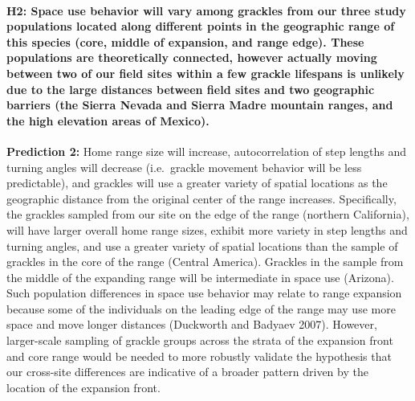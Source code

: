 \documentclass[
]{article}
\begin{document}
\hypertarget{h2-space-use-behavior-will-vary-among-grackles-from-our-three-study-populations-located-along-different-points-in-the-geographic-range-of-this-species-core-middle-of-expansion-and-range-edge.-these-populations-are-theoretically-connected-however-actually-moving-between-two-of-our-field-sites-within-a-few-grackle-lifespans-is-unlikely-due-to-the-large-distances-between-field-sites-and-two-geographic-barriers-the-sierra-nevada-and-sierra-madre-mountain-ranges-and-the-high-elevation-areas-of-mexico.}{%
\paragraph{H2: Space use behavior will vary among grackles from our
three study populations located along different points in the geographic
range of this species (core, middle of expansion, and range edge). These
populations are theoretically connected, however actually moving between
two of our field sites within a few grackle lifespans is unlikely due to
the large distances between field sites and two geographic barriers (the
Sierra Nevada and Sierra Madre mountain ranges, and the high elevation
areas of
Mexico).}\label{h2-space-use-behavior-will-vary-among-grackles-from-our-three-study-populations-located-along-different-points-in-the-geographic-range-of-this-species-core-middle-of-expansion-and-range-edge.-these-populations-are-theoretically-connected-however-actually-moving-between-two-of-our-field-sites-within-a-few-grackle-lifespans-is-unlikely-due-to-the-large-distances-between-field-sites-and-two-geographic-barriers-the-sierra-nevada-and-sierra-madre-mountain-ranges-and-the-high-elevation-areas-of-mexico.}}

\textbf{Prediction 2:} Home range size will increase, autocorrelation of
step lengths and turning angles will decrease (i.e.~grackle movement
behavior will be less predictable), and grackles will use a greater
variety of spatial locations as the geographic distance from the
original center of the range increases. Specifically, the grackles
sampled from our site on the edge of the range (northern California),
will have larger overall home range sizes, exhibit more variety in step
lengths and turning angles, and use a greater variety of spatial
locations than the sample of grackles in the core of the range (Central
America). Grackles in the sample from the middle of the expanding range
will be intermediate in space use (Arizona). Such population differences
in space use behavior may relate to range expansion because some of the
individuals on the leading edge of the range may use more space and move
longer distances (Duckworth and Badyaev 2007). However, larger-scale
sampling of grackle groups across the strata of the expansion front and
core range would be needed to more robustly validate the hypothesis that
our cross-site differences are indicative of a broader pattern driven by
the location of the expansion front.
\end{document}
